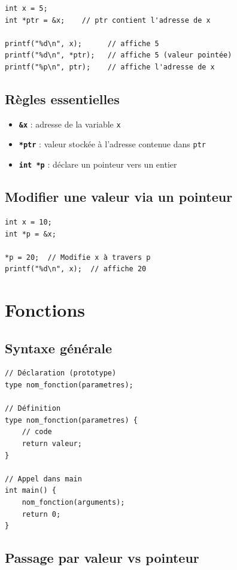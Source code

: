\documentclass[12pt,a4paper]{article}
\begin{document}
\begin{lstlisting}
int x = 5;
int *ptr = &x;    // ptr contient l'adresse de x

printf("%d\n", x);      // affiche 5
printf("%d\n", *ptr);   // affiche 5 (valeur pointée)
printf("%p\n", ptr);    // affiche l'adresse de x
\end{lstlisting}

\subsection{Règles essentielles}

\begin{itemize}
    \item \textbf{\texttt{\&x}} : adresse de la variable \texttt{x}
    \item \textbf{\texttt{*ptr}} : valeur stockée à l'adresse contenue dans \texttt{ptr}
    \item \textbf{\texttt{int *p}} : déclare un pointeur vers un entier
\end{itemize}

\subsection{Modifier une valeur via un pointeur}

\begin{lstlisting}
int x = 10;
int *p = &x;

*p = 20;  // Modifie x à travers p
printf("%d\n", x);  // affiche 20
\end{lstlisting}

\section{Fonctions}

\subsection{Syntaxe générale}

\begin{lstlisting}
// Déclaration (prototype)
type nom_fonction(parametres);

// Définition
type nom_fonction(parametres) {
    // code
    return valeur;
}

// Appel dans main
int main() {
    nom_fonction(arguments);
    return 0;
}
\end{lstlisting}

\subsection{Passage par valeur vs pointeur}
\end{document}
